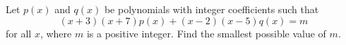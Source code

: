 Let $p(x)$ and $q(x)$ be polynomials with integer coefficients such that
\[
(x+3)(x+7)p(x)+(x-2)(x-5)q(x)=m
\]
for all $x$, where $m$ is a positive integer. Find the smallest possible value of $m$.
